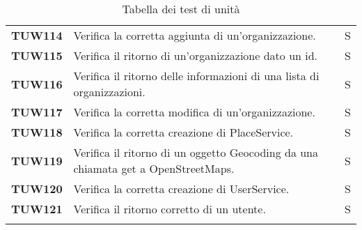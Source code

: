 \documentclass[../piano-di-qualifica.tex]{subfiles}
\begin{document}
\begin{longtable}[H]{>{\centering\bfseries}m{3cm} >{}m{10cm} >{\centering\arraybackslash}m{3cm}}
TUW114             & Verifica la corretta aggiunta di un'organizzazione. & S \\ 
 
TUW115             & Verifica il ritorno di un'organizzazione dato un id. & S \\ 

TUW116             & Verifica il ritorno delle informazioni di una lista di organizzazioni. & S \\ 

TUW117             & Verifica la corretta modifica di un'organizzazione. & S \\ 

TUW118             & Verifica la corretta creazione di PlaceService. & S \\ 

TUW119             & Verifica il ritorno di un oggetto Geocoding da una chiamata get a OpenStreetMaps. & S \\ 
 

TUW120             & Verifica la corretta creazione di UserService. & S \\ 

TUW121             & Verifica il ritorno corretto di un utente. & S \\ 

  \rowcolor{white}
  \caption{Tabella dei test di unità}%
  \label{tab:test_di_unità}
\end{longtable}
\end{document}
